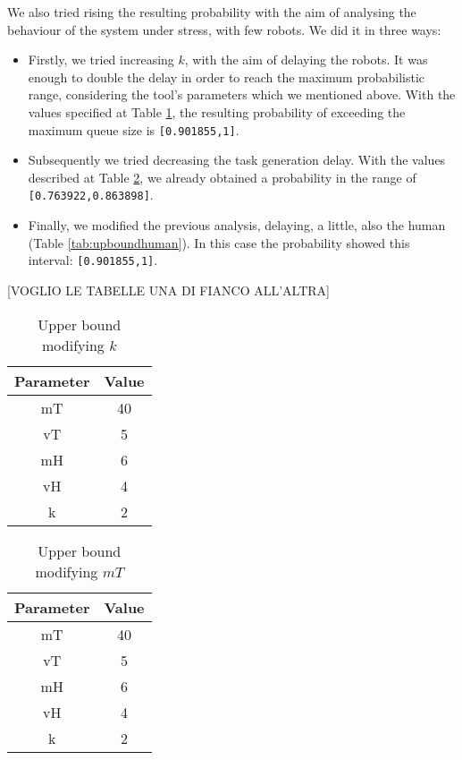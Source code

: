 We also tried rising the resulting probability with the aim of analysing the behaviour of the system under stress, with few robots. We did it in three ways:
\begin{itemize}
    \item Firstly, we tried increasing $k$, with the aim of delaying the robots. It was enough to double the delay in order to reach the maximum probabilistic range, considering the tool's parameters which we mentioned above. With the values specified at Table \ref{tab:upboundrobot}, the resulting probability of exceeding the maximum queue size is \texttt{[0.901855,1]}.
    \item Subsequently we tried decreasing the task generation delay. With the values described at Table \ref{tab:upboundtask}, we already obtained a probability in the range of \texttt{[0.763922,0.863898]}.
    \item Finally, we modified the previous analysis, delaying, a little, also the human (Table \ref{tab:upboundhuman}). In this case the probability showed this interval: \texttt{[0.901855,1]}.
\end{itemize}

[VOGLIO LE TABELLE UNA DI FIANCO ALL'ALTRA]

\begin{table}[h]
    \centering
        \begin{tabular}{|c c|} 
            \hline
            Parameter & Value \\ [0.5ex] 
            \hline\hline
            mT & 40 \\
            vT & 5 \\
            mH & 6 \\
            vH & 4 \\
            k & 2 \\ [0.5ex] 
            \hline
        \end{tabular}
        \caption{Upper bound modifying $k$}
        \label{tab:upboundrobot}
\end{table}

\begin{table}[h]
    \centering
        \begin{tabular}{|c c|} 
            \hline
            Parameter & Value \\ [0.5ex] 
            \hline\hline
            mT & 40 \\
            vT & 5 \\
            mH & 6 \\
            vH & 4 \\
            k & 2 \\ [0.5ex] 
            \hline
        \end{tabular}
        \caption{Upper bound modifying $mT$}
        \label{tab:upboundtask}
\end{table}

